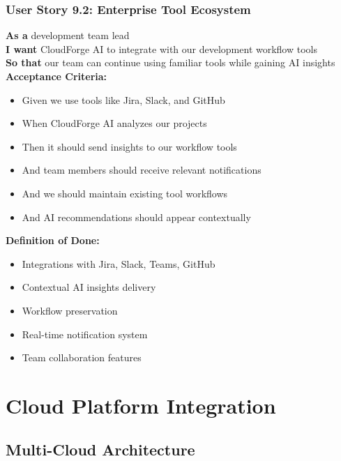 \subsubsection{User Story 9.2: Enterprise Tool Ecosystem}

\begin{tcolorbox}[colback=lightgray, colframe=primaryblue, title=US-9.2: Enterprise Tool Ecosystem]
\textbf{As a} development team lead \\
\textbf{I want} CloudForge AI to integrate with our development workflow tools \\
\textbf{So that} our team can continue using familiar tools while gaining AI insights \\

\textbf{Acceptance Criteria:}
\begin{itemize}
    \item Given we use tools like Jira, Slack, and GitHub
    \item When CloudForge AI analyzes our projects
    \item Then it should send insights to our workflow tools
    \item And team members should receive relevant notifications
    \item And we should maintain existing tool workflows
    \item And AI recommendations should appear contextually
\end{itemize}

\textbf{Definition of Done:}
\begin{itemize}
    \item Integrations with Jira, Slack, Teams, GitHub
    \item Contextual AI insights delivery
    \item Workflow preservation
    \item Real-time notification system
    \item Team collaboration features
\end{itemize}
\end{tcolorbox}

\section{Cloud Platform Integration}

\subsection{Multi-Cloud Architecture}

